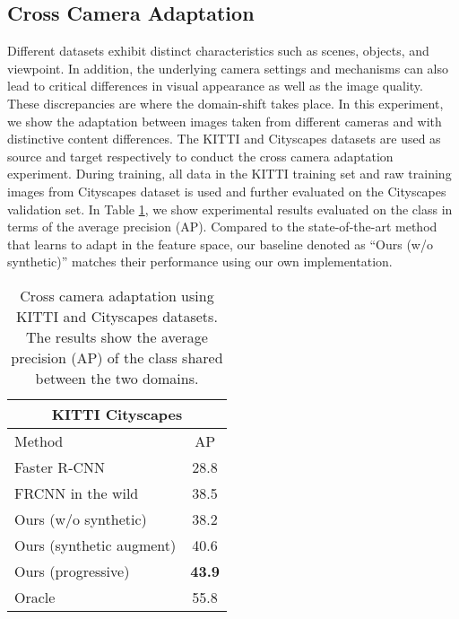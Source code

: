 \documentclass[10pt,twocolumn,letterpaper]{article}
\begin{document}
\subsection{Cross Camera Adaptation} \label{K_C}
Different datasets exhibit distinct characteristics such as scenes, objects, and viewpoint.
In addition, the underlying camera settings and mechanisms can also lead to critical differences in visual appearance as well as the image quality.
These discrepancies are where the domain-shift takes place.
In this experiment, we show the adaptation between images taken from different cameras and with distinctive content differences.
The KITTI \cite{Geiger2012CVPR} and Cityscapes \cite{Cordts2016Cityscapes} datasets are used as source and target respectively to conduct the cross camera adaptation experiment.
During training, all data in the KITTI training set and raw training images from Cityscapes dataset is used and further evaluated on the Cityscapes validation set.
In Table \ref{tab:K_C}, we show experimental results evaluated on the  class in terms of the average precision (AP).
Compared to the state-of-the-art method \cite{chen2018domain} that learns to adapt in the feature space, our baseline denoted as ``Ours (w/o synthetic)'' matches their performance using our own implementation.

\begingroup
\renewcommand{\arraystretch}{1}
\begin{table}
\begin{center}
\caption{
Cross camera adaptation using KITTI and Cityscapes datasets.
The results show the average precision (AP) of the  class shared between the two domains.
}
\vspace{3mm}
\label{tab:K_C}
\begin{tabular}{lc}
				\toprule
                \multicolumn{2}{c}{KITTI  Cityscapes} \\
				\midrule
                Method  & AP \\
                \midrule
                Faster R-CNN &  28.8\\
                \midrule
                FRCNN in the wild \cite{chen2018domain} & 38.5\\
                Ours (w/o synthetic)        & 38.2 \\
                Ours (synthetic augment) & 40.6\\
                Ours (progressive) & \textbf{43.9}  \\
			   \midrule
			   Oracle & 55.8 \\
			   \bottomrule
\end{tabular}
\vspace{-3mm}
\end{center}
\end{table}
\endgroup
\end{document}
